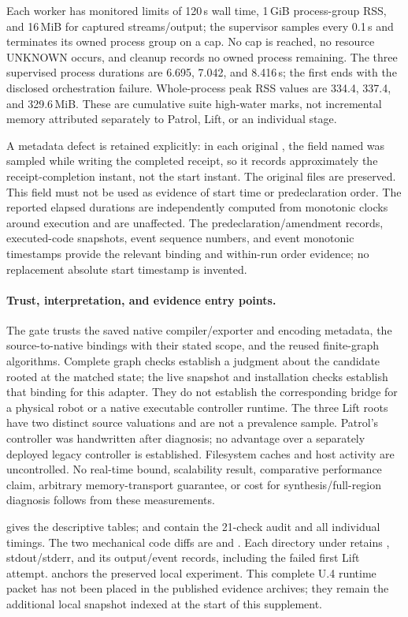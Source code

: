 Each worker has monitored limits of 120\,s wall time, 1\,GiB
process-group RSS, and 16\,MiB for captured streams/output; the supervisor
samples every 0.1\,s and terminates its owned process group on a cap.
No cap is reached, no resource UNKNOWN occurs, and cleanup records no
owned process remaining. The three supervised process durations are
6.695, 7.042, and 8.416\,s; the first ends with the disclosed orchestration
failure. Whole-process peak RSS values are 334.4, 337.4, and
329.6\,MiB. These are cumulative suite high-water marks, not incremental
memory attributed separately to Patrol, Lift, or an individual stage.

A metadata defect is retained explicitly: in each original
, the field named  was sampled
while writing the completed receipt, so it records approximately the
receipt-completion instant, not the start instant. The original files
are preserved. This field must not be used as evidence of start time or
predeclaration order. The reported elapsed durations are independently
computed from monotonic clocks around execution and are unaffected.
The predeclaration/amendment records, executed-code snapshots, event
sequence numbers, and event monotonic timestamps provide the relevant
binding and within-run order evidence; no replacement absolute start
timestamp is invented.

\paragraph{Trust, interpretation, and evidence entry points.}
The gate trusts the saved native compiler/exporter and encoding metadata,
the source-to-native bindings with their stated scope, and the reused
finite-graph algorithms. Complete graph checks establish a judgment
about the candidate rooted at the matched state; the live snapshot and
installation checks establish that binding for this adapter. They do
not establish the corresponding bridge for a physical robot or a native
executable controller runtime. The three Lift roots have two distinct
source valuations and are not a prevalence sample. Patrol's controller
was handwritten after diagnosis; no advantage over a separately
deployed legacy controller is established. Filesystem caches and host
activity are uncontrolled. No real-time bound, scalability result,
comparative performance claim, arbitrary memory-transport guarantee, or
cost for synthesis/full-region diagnosis follows from these measurements.

 gives the descriptive tables;
 and  contain the
21-check audit and all individual timings. The two mechanical code
diffs are  and
. Each directory under 
retains , stdout/stderr, and its output/event records,
including the failed first Lift attempt.  anchors
the preserved local experiment. This complete U.4 runtime packet has not been placed
in the published evidence archives; they remain the additional local
snapshot indexed at the start of this supplement.

